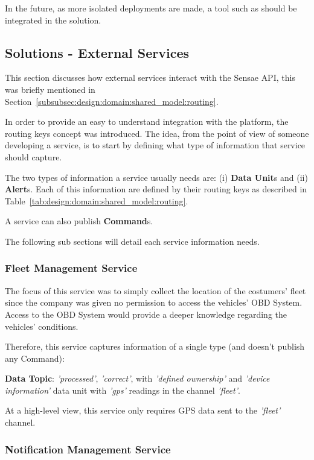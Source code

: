 In the future, as more isolated deployments are made, a tool such as  should be integrated in the solution.

\subsection{Solutions - External Services}
\label{subsec:implementation:description:services}

This section discusses how external services interact with the Sensae \gls{API}, this was briefly mentioned in Section~\ref{subsubsec:design:domain:shared_model:routing}.

In order to provide an easy to understand integration with the platform, the routing keys concept was introduced. The idea, from the point of view of someone developing a service, is to start by defining what type of information that service should capture.

The two types of information a service usually needs are: (i) \textbf{Data Unit}s and (ii) \textbf{Alert}s. Each of this information are defined by their routing keys as described in Table~\ref{tab:design:domain:shared_model:routing}.

A service can also publish \textbf{Command}s.

The following sub sections will detail each service information needs.

\subsubsection{Fleet Management Service}
\label{subsubsec:implementation:description:services:fleet}

The focus of this service was to simply collect the location of the costumers' fleet since the company was given no permission to access the vehicles' \gls{OBD} System. Access to the \gls{OBD} System would provide a deeper knowledge regarding the vehicles' conditions.

Therefore, this service captures information of a single type (and doesn't publish any Command):

\textbf{Data Topic}: \textit{'processed'}, \textit{'correct'}, with \textit{'defined ownership'} and \textit{'device information'} data unit with \textit{'gps'} readings in the channel \textit{'fleet'}.

At a high-level view, this service only requires \gls{GPS} data sent to the \textit{'fleet'} channel.

\subsubsection{Notification Management Service}
\label{subsubsec:implementation:description:services:notification}


